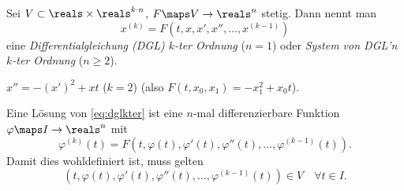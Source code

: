 \begin{definition*}
  Sei \( V\subset \reals\times \reals^{k\cdot n} \), \( F\maps V\to \reals^n \) stetig. Dann nennt man
  \begin{equation*}
    x^{(k)}=F(t,x,x',x'',\dotsc,x^{(k-1)})\tag{\( * \)} \label{eq:dglkter}
  \end{equation*}
  eine \emph{Differentialgleichung (DGL) \( k \)-ter Ordnung} (\( n=1 \)) oder \emph{System von DGL'n \( k \)-ter Ordnung} (\( n\geq 2 \)).
  \begin{beispiel*}
    \( x''=-(x')^2+xt \) (\( k=2 \)) (also \( F(t,x_0,x_1)=-x_1^2+x_0t \)).
  \end{beispiel*}
  Eine Lösung von \eqref{eq:dglkter} ist eine \( n \)-mal differenzierbare Funktion \( \varphi\maps I\to \reals^n \) mit
  \begin{equation*}
    \varphi^{(k)}(t)=F(t,\varphi(t),\varphi'(t),\varphi''(t),\dotsc,\varphi^{(k-1)}(t)).
  \end{equation*}
  Damit dies wohldefiniert ist, muss gelten
  \begin{equation*}
    (t,\varphi(t),\varphi'(t),\varphi''(t),\dotsc,\varphi^{(k-1)}(t))\in V\quad \forall t\in I.
  \end{equation*}
\end{definition*}

